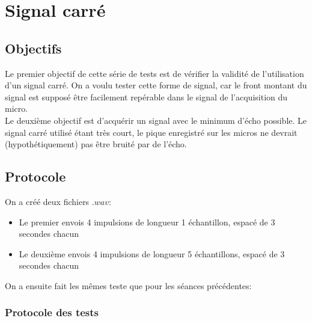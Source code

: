 \documentclass[12pt,a4paper]{report}
\begin{document}
\chapter{Signal carré}\label{signal_carre}
\section{Objectifs}
Le premier objectif de cette série de tests est de vérifier la validité de l'utilisation d'un signal carré.
On a voulu tester cette forme de signal, car le front montant du signal est supposé être facilement repérable dans le signal de l'acquisition du micro. \\
Le deuxième objectif est d'acquérir un signal avec le minimum d'écho possible. Le signal carré utilisé étant très court, le pique enregistré sur les micros ne devrait (hypothétiquement) pas être bruité par de l'écho.

\section{Protocole}\label{protocole}
On a créé deux fichiers $.wav$:
\begin{itemize}
\item Le premier envois 4 impulsions  de longueur 1 échantillon, espacé de 3 secondes chacun
\item Le deuxième envois 4 impulsions de longueur 5 échantillons, espacé de 3 secondes chacun
\end{itemize}
On a ensuite fait les mêmes teste que pour les séances précédentes:

\subsection{Protocole des tests}
 
\end{document}
